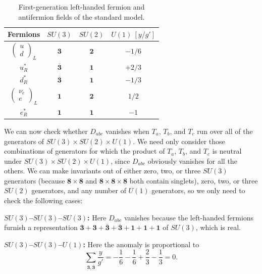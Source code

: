 \begin{table}[htbp]
 \centering
 \begingroup
 \renewcommand{\thetable}{22.1}
 \caption{First-generation left-handed fermion and antifermion fields of
 the standard model.}
 \label{tab:22.1}
 \renewcommand{\arraystretch}{1.35}
 \begin{tabular}{c@{\qquad}c@{\qquad}c@{\qquad}c}
  \hline\hline
  Fermions & $SU(3)$ & $SU(2)$ & $U(1)\ [y/g']$\\
  \hline
  $\begin{pmatrix}u\\ d\end{pmatrix}_{\!L}$
    & $\mathbf 3$ & $\mathbf 2$ & $-1/6$\\
  $u_R^*$ & $\overline{\mathbf 3}$ & $\mathbf{1}$ & $+2/3$\\
  $d_R^*$ & $\overline{\mathbf 3}$ & $\mathbf{1}$ & $-1/3$\\
  $\begin{pmatrix}\nu_e\\ e\end{pmatrix}_{\!L}$
    & $\mathbf{1}$ & $\mathbf 2$ & $1/2$\\
  $e_R^*$ & $\mathbf{1}$ & $\mathbf{1}$ & $-1$\\
  \hline\hline
 \end{tabular}
 \endgroup
\end{table}

We can now check whether $D_{abc}$ vanishes when $T_a$,
$T_b$, and $T_c$ run over all of the generators of
$SU(3)\times SU(2)\times U(1)$. We need only consider those combinations of
generators for which the product of $T_a$, $T_b$, and $T_c$
is neutral under $SU(3)\times SU(2)\times U(1)$, since
$D_{abc}$ obviously vanishes for all the others. We can make
invariants out of either zero, two, or three $SU(3)$ generators (because
$\mathbf8\times\mathbf8$ and
$\mathbf8\times\mathbf8\times\mathbf8$ both contain singlets), zero, two, or
three $SU(2)$ generators, and any number of $U(1)$ generators, so we only
need to check the following cases:

\noindent\textbf{\boldmath$SU(3)$--$SU(3)$--$SU(3)$:}
Here $D_{abc}$ vanishes because the left-handed fermions
furnish a representation
$\mathbf3+\mathbf3+\overline{\mathbf3}+\overline{\mathbf3}
+\mathbf{1}+\mathbf{1}+\mathbf{1}$ of $SU(3)$, which is real.

\noindent\textbf{\boldmath$SU(3)$--$SU(3)$--$U(1)$:}
Here the anomaly is proportional to
\[
 \sum_{\mathbf3,\overline{\mathbf3}}\frac{y}{g'}
 =-\frac{1}{6}-\frac{1}{6}+\frac{2}{3}-\frac{1}{3}=0.
\]


